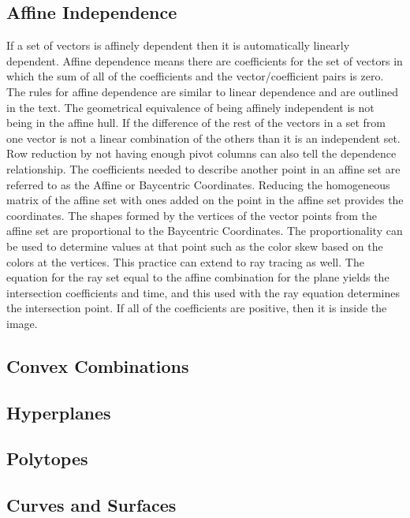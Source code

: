 \documentclass[12pt]{article}
\begin{document}
\subsection{Affine Independence}
If a set of vectors is affinely dependent then it is automatically linearly dependent. Affine dependence means there are coefficients for the set of vectors in which the sum of all of the 
coefficients and the vector/coefficient pairs is zero. The rules for affine dependence are similar to linear dependence and are outlined in the text. The geometrical equivalence of 
being affinely independent is not being in the affine hull. If the difference of the rest of the vectors in a set from one vector is not a linear combination of the others than it 
is an independent set. Row reduction by not having enough pivot columns can also tell the dependence relationship. The coefficients needed to describe another point in an affine set are 
referred to as the Affine or Baycentric Coordinates. Reducing the homogeneous matrix of the affine set with ones added on the point in the affine set provides the coordinates. 
The shapes formed by the vertices of the vector points from the affine set are proportional to the Baycentric Coordinates. The proportionality can be used to determine values at 
that point such as the color skew based on the colors at the vertices. This practice can extend to ray tracing as well. The equation for the ray set equal to the affine combination 
for the plane yields the intersection coefficients and time, and this used with the ray equation determines the intersection point. If all of the coefficients are positive, then it is 
inside the image. 
\subsection{Convex Combinations}
\subsection{Hyperplanes}
\subsection{Polytopes}
\subsection{Curves and Surfaces}
\end{document}
